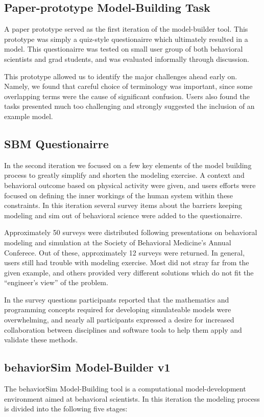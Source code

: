 \documentclass[conference]{IEEEtran}
\begin{document}
\subsection{Paper-prototype Model-Building Task}
A paper prototype served as the first iteration of the model-builder tool.
This prototype was simply a quiz-style questionairre which ultimately resulted in a model.
This questionairre was tested on small user group of both behavioral scientists and grad students, and was evaluated informally through discussion.

This prototype allowed us to identify the major challenges ahead early on.
Namely, we found that careful choice of terminology was important, since some overlapping terms were the cause of significant confusion.
Users also found the tasks presented much too challenging and strongly suggested the inclusion of an example model.
   
\subsection{SBM Questionairre}
In the second iteration we focused on a few key elements of the model building process to greatly simplify and shorten the modeling exercise.
A context and behavioral outcome based on physical activity were given, and users efforts were focused on defining the inner workings of the human system within these constraints.
In this iteration several survey items about the barriers keeping modeling and sim out of behavioral science were added to the questionairre.

Approximately 50 surveys were distributed following presentations on behavioral modeling and simulation at the Society of Behavioral Medicine's Annual Conferece. 
Out of these, approximately 12 surveys were returned.
In general, users still had trouble with modeling exercise.
Most did not stray far from the given example, and others provided very different solutions which do not fit the ``engineer's view'' of the problem.

In the survey questions participants reported that the mathematics and programming concepts required for developing simulateable models were overwhelming, and nearly all participants expressed a desire for increased collaboration between disciplines and software tools to help them apply and validate these methods.
  
\subsection{behaviorSim Model-Builder v1}
The behaviorSim Model-Building tool is a computational model-development environment aimed at behavioral scientists.
In this iteration the modeling process is divided into the following five stages:
\end{document}
